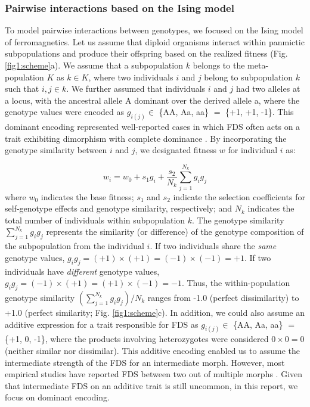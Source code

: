 \documentclass[12pt,]{article}
\begin{document}
\subsubsection{Pairwise interactions based on the Ising model}
To model pairwise interactions between genotypes, we focused on the Ising model of ferromagnetics. Let us assume that diploid organisms interact within panmictic subpopulations and produce their offspring based on the realized fitness (Fig. \ref{fig1:scheme}a). We assume that a subpopulation $k$ belongs to the meta-population $K$ as $k \in K$, where two individuals $i$ and $j$ belong to subpopulation $k$ such that $i,j \in k$. We further assumed that individuals $i$ and $j$ had two alleles at a locus, with the ancestral allele A dominant over the derived allele a, where the genotype values were encoded as $g_{i(j)} \in$ \{AA, Aa, aa\} $=$ \{+1, +1, -1\}. This dominant encoding represented well-reported cases in which FDS often acts on a trait exhibiting dimorphism with complete dominance \citep[for example,][]{takahashi2010negative,sato2017herbivore}. By incorporating the genotype similarity between $i$ and $j$, we designated fitness $w$ for individual $i$ as:

\begin{equation}
w_i = w_0 + s_1 g_i + \frac{s_2}{N_k}\sum^{N_{k}}_{j=1}{g_ig_j}\label{eq:1}
\end{equation}
\noindent
where $w_0$ indicates the base fitness; $s_1$ and $s_2$ indicate the selection coefficients for self-genotype effects and genotype similarity, respectively; and $N_k$ indicates the total number of individuals within subpopulation $k$. The genotype similarity $\sum^{N_{k}}_{j=1}{g_ig_j}$ represents the similarity (or difference) of the genotype composition of the subpopulation from the individual $i$. If two individuals share the \textit{same} genotype values, $g_ig_j = (+1)\times(+1) = (-1)\times(-1) = +1$. If two individuals have \textit{different} genotype values, $g_ig_j = (-1)\times(+1) = (+1)\times(-1) = -1$. Thus, the within-population genotype similarity $(\sum^{N_{k}}_{j=1}{g_ig_j})/N_k$ ranges from -1.0 (perfect dissimilarity) to +1.0 (perfect similarity; Fig. \ref{fig1:scheme}c). In addition, we could also assume an additive expression for a trait responsible for FDS as $g_{i(j)} \in$ \{AA, Aa, aa\} $=$ \{+1, 0, -1\}, where the products involving heterozygotes were considered $0 \times 0 = 0$ (neither similar nor dissimilar). This additive encoding enabled us to assume the intermediate strength of the FDS for an intermediate morph. However, most empirical studies have reported FDS between two out of multiple morphs \citep[e.g.,][]{gigord2001negative,takahashi2010negative,le2015evolutionary,sato2017herbivore,nosil2018natural}. Given that intermediate FDS on an additive trait is still uncommon, in this report, we focus on dominant encoding.
\end{document}
